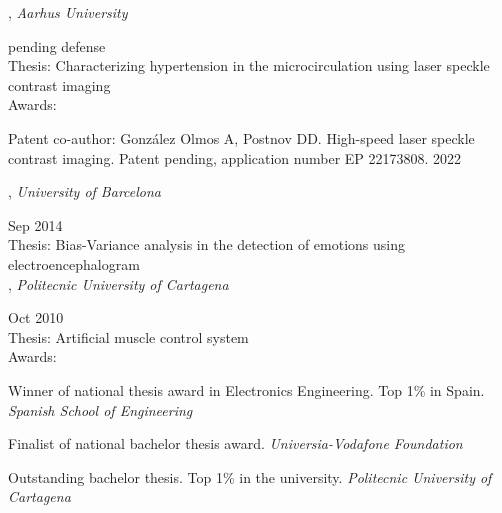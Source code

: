 
,
\textit{Aarhus University}\strut \hfill pending defense\\
Thesis: Characterizing hypertension in the microcirculation using laser speckle contrast imaging\\
Awards: \\
\vspace*{\spaceAfterField}
\begin{zitemize}
\item Patent co-author: Gonz\'alez Olmos A, Postnov DD. High-speed laser speckle contrast imaging. Patent pending, application number EP 22173808.
 \hfill 2022
\end{zitemize}

,
\textit{University of Barcelona}\strut \hfill Sep 2014\\
Thesis: Bias-Variance analysis in the detection of emotions using electroencephalogram\\

,
\textit{Politecnic University of Cartagena}\strut \hfill Oct 2010\\
Thesis: Artificial muscle control system\\
Awards: \\
\vspace*{\spaceAfterField}
\begin{zitemize}
\item Winner of national thesis award in Electronics Engineering. Top 1\% in Spain. \textit{Spanish School of Engineering} 
\item Finalist of national bachelor thesis award. \textit{Universia-Vodafone Foundation} 
\item Outstanding bachelor thesis. Top 1\% in the university. \textit{Politecnic University of Cartagena}
\end{zitemize}

